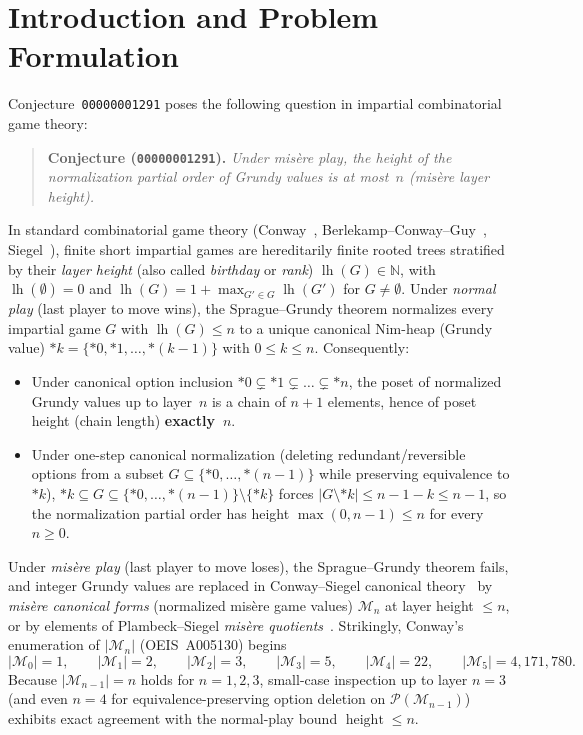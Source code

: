 \documentclass[11pt]{amsart}
\theoremstyle{definition}
\theoremstyle{remark}
\newcommand{\Mlayer}{\mathcal{M}}
\DeclareMathOperator{\lh}{lh}
\DeclareMathOperator{\height}{height}
\begin{document}
\maketitle

\section{Introduction and Problem Formulation}

Conjecture~\texttt{00000001291} poses the following question in impartial combinatorial game theory:
\begin{quote}
\textbf{Conjecture (\texttt{00000001291}).} \emph{Under mis\`ere play, the height of the normalization partial order of Grundy values is at most~$n$ (mis\`ere layer height).}
\end{quote}

In standard combinatorial game theory (Conway~\cite{ConwayONAG}, Berlekamp--Conway--Guy~\cite{WinningWays}, Siegel~\cite{SiegelCGT}), finite short impartial games are hereditarily finite rooted trees stratified by their \emph{layer height} (also called \emph{birthday} or \emph{rank}) $\lh(G) \in \mathbb{N}$, with $\lh(\emptyset)=0$ and $\lh(G) = 1 + \max_{G' \in G}\lh(G')$ for $G \neq \emptyset$. Under \emph{normal play} (last player to move wins), the Sprague--Grundy theorem normalizes every impartial game $G$ with $\lh(G) \le n$ to a unique canonical Nim-heap (Grundy value) $*k = \{*0, *1, \dots, *(k-1)\}$ with $0 \le k \le n$. Consequently:
\begin{itemize}
  \item Under canonical option inclusion $*0 \subsetneq *1 \subsetneq \dots \subsetneq *n$, the poset of normalized Grundy values up to layer~$n$ is a chain of $n+1$ elements, hence of poset height (chain length) \textbf{exactly~$n$}.
  \item Under one-step canonical normalization (deleting redundant/reversible options from a subset $G \subseteq \{*0,\dots,*(n-1)\}$ while preserving equivalence to $*k$), $*k \subseteq G \subseteq \{*0,\dots,*(n-1)\} \setminus \{*k\}$ forces $|G \setminus *k| \le n - 1 - k \le n - 1$, so the normalization partial order has height $\max(0, n-1) \le n$ for every $n \ge 0$.
\end{itemize}

Under \emph{mis\`ere play} (last player to move loses), the Sprague--Grundy theorem fails, and integer Grundy values are replaced in Conway--Siegel canonical theory~\cite[Ch.~V]{SiegelCGT} by \emph{mis\`ere canonical forms} (normalized mis\`ere game values) $\Mlayer_n$ at layer height $\le n$, or by elements of Plambeck--Siegel \emph{mis\`ere quotients}~\cite{Plambeck2005,PlambeckSiegel2008}. Strikingly, Conway's enumeration of $|\Mlayer_n|$ (OEIS~A005130) begins
\[
  |\Mlayer_0| = 1,\qquad |\Mlayer_1| = 2,\qquad |\Mlayer_2| = 3,\qquad |\Mlayer_3| = 5,\qquad |\Mlayer_4| = 22,\qquad |\Mlayer_5| = 4{,}171{,}780.
\]
Because $|\Mlayer_{n-1}| = n$ holds for $n = 1, 2, 3$, small-case inspection up to layer $n = 3$ (and even $n = 4$ for equivalence-preserving option deletion on $\mathcal{P}(\Mlayer_{n-1})$) exhibits exact agreement with the normal-play bound $\height \le n$.
\end{document}
